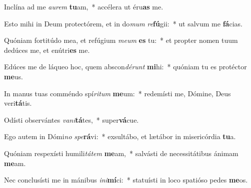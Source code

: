 \item Inclína ad me \textit{au}\textit{rem} \textbf{tu}am,~* accélera ut éru\textbf{as} me.
\item Esto mihi in Deum protectórem, et in do\textit{mum} \textit{re}\textbf{fú}gii:~* ut salvum me \textbf{fá}cias.
\item Quóniam fortitúdo mea, et refúgium \textit{me}\textit{um} \textbf{es} tu:~* et propter nomen tuum dedúces me, et enútri\textbf{es} me.
\item Edúces me de láqueo hoc, quem abscon\textit{dé}\textit{runt} \textbf{mi}hi:~* quóniam tu es protéctor \textbf{me}us.
\item In manus tuas comméndo spí\textit{ri}\textit{tum} \textbf{me}um:~* redemísti me, Dómine, Deus veri\textbf{tá}tis.
\item Odísti observántes \textit{va}\textit{ni}\textbf{tá}tes,~* super\textbf{vá}cue.
\item Ego autem in Dómi\textit{no} \textit{spe}\textbf{rá}vi:~* exsultábo, et lætábor in misericórdia \textbf{tu}a.
\item Quóniam respexísti humili\textit{tá}\textit{tem} \textbf{me}am,~* salvásti de necessitátibus ánimam \textbf{me}am.
\item Nec conclusísti me in mánibus \textit{in}\textit{i}\textbf{mí}ci:~* statuísti in loco spatióso pedes \textbf{me}os.
